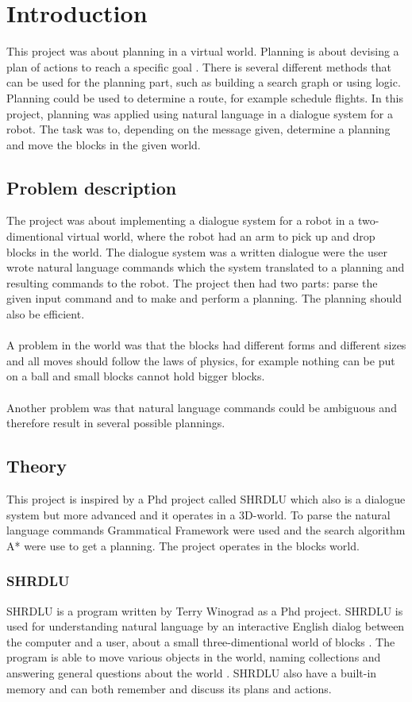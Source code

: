 \chapter{Introduction}
This project was about planning in a virtual world. Planning is about devising a plan of actions to reach a specific goal \citep{planning_ai}. There is several different methods that can be used for the planning part, such as building a search graph or using logic. 
Planning could be used to determine a route, for example schedule flights. In this project, planning was applied using natural language in a dialogue system for a robot. The task was to, depending on the message given, determine a planning and move the blocks in the given world.

\section{Problem description}
The project was about implementing a dialogue system for a robot in a two-dimentional virtual world, where the robot had an arm to pick up and drop blocks in the world. The dialogue system was a written dialogue were the user wrote natural language commands which the system translated to a planning and resulting commands to the robot. The project then had two parts: parse the given input command and to make and perform a planning. The planning should also be efficient. \\\\
A problem in the world was that the blocks had different forms and different sizes and all moves should follow the laws of physics, for example nothing can be put on a ball and small blocks cannot hold bigger blocks. \\\\
Another problem was that natural language commands could be ambiguous and therefore result in several possible plannings.

\section{Theory}
This project is inspired by a Phd project called SHRDLU which also is a dialogue system but more advanced and it operates in a 3D-world. To parse the natural language commands Grammatical Framework were used and the search algorithm A* were use to get a planning. The project operates in the blocks world.

\subsection{SHRDLU}
SHRDLU is a program written by Terry Winograd as a Phd project. SHRDLU is used for understanding natural language by an interactive English dialog between the computer and a user, about a small three-dimentional world of blocks \citep{SHRDLU_url}. The program is able to move various objects in the world, naming collections and answering general questions about the world \citep{SHRDLU_url}. SHRDLU also have a built-in memory and can both remember and discuss its plans and actions.

